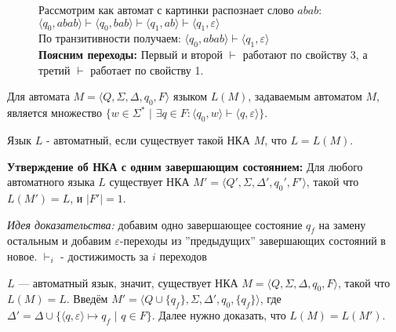\begin{figure}[h]
    \hspace{-4ex} \begin{minipage}[h]{0.6\linewidth}
    \end{minipage}
    \hfill
    \hspace{-4ex} \begin{minipage}[h]{0.5\linewidth}
    \Example Рассмотрим как автомат с картинки распознает слово $abab$:
    \newline $\langle q_0, abab \rangle \vdash \langle q_0, bab \rangle \vdash \langle q_1, ab \rangle \vdash \langle q_1, \varepsilon\rangle$ \\
    По транзитивности получаем: $\langle q_0, abab \rangle \vdash \langle q_1, \varepsilon\rangle$ \\
    \newline \textbf{Поясним переходы:} 
    \newline Первый и второй $\vdash$ работают по свойству 3, \newline а третий $\vdash$ работает по свойству 1.
    \end{minipage}
\end{figure}

\Def Для автомата $M = \langle Q, \Sigma, \Delta, q_0, F \rangle$ языком $L(M)$, задаваемым автоматом $M$, является множество $\{ w \in \Sigma^* \,\, | \,\, \exists q \in F : \langle q_0, w \rangle \vdash \langle q, \varepsilon \rangle \}$.

\Def Язык $L$ - автоматный, если существует такой НКА $M$, что $L = L (M)$.

\textbf{Утверждение об НКА с одним завершающим состоянием:} Для любого автоматного языка $L$ существует НКА $M' = \langle Q', \Sigma, \Delta', q_0', F' \rangle$, такой что $L(M') = L$, и $|F'| = 1$.

\textit{Идея доказательства:} добавим одно завершающее состояние $q_f$ на замену остальным и добавим $\varepsilon$-переходы из ''предыдущих'' завершающих состояний в новое. \newline \Vars$\vdash_i$ - достижимость за $i$ переходов

\Proof $L$ — автоматный язык, значит, существует НКА $M = \langle Q, \Sigma, \Delta, q_0, F \rangle$, такой что $L (M) = L$. Введём $M' = \langle Q \cup \{ q_f \}, \Sigma, \Delta', q_0, \{ q_f \} \rangle$, где $\Delta' = \Delta \cup \{ \langle q, \varepsilon \rangle \mapsto q_f \,\,|\,\, q \in F \}$. Далее нужно доказать, что $L (M) = L(M')$.

